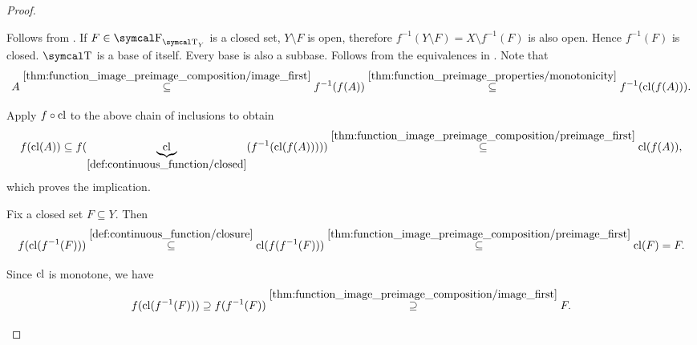 \begin{proof}
  \begin{description}
     Follows from .
     If \( F \in \CF_{\CT_Y} \) is a closed set, \( Y \setminus F \) is open, therefore \( f^{-1}(Y \setminus F) = X \setminus f^{-1}(F) \) is also open. Hence \( f^{-1}(F) \) is closed.
     \( \CT \) is a base of itself.
     Every base is also a subbase.
     Follows from the equivalences in .
     Note that
    \begin{equation*}
      A
      \overset {\ref{thm:function_image_preimage_composition/image_first}} \subseteq
      f^{-1}(f(A))
      \overset {\ref{thm:function_preimage_properties/monotonicity}} \subseteq
      f^{-1}(\operatorname{cl}(f(A))).
    \end{equation*}

    Apply \( f \circ \operatorname{cl} \) to the above chain of inclusions to obtain
    \begin{equation*}
      f(\operatorname{cl}(A))
      \subseteq
      f(\underbrace{\operatorname{cl}}_{\ref{def:continuous_function/closed}}(f^{-1}(\operatorname{cl}(f(A)))))
      \overset {\ref{thm:function_image_preimage_composition/preimage_first}} \subseteq
      \operatorname{cl}(f(A)),
    \end{equation*}
    which proves the implication.

     Fix a closed set \( F \subseteq Y \). Then
    \begin{equation}\label{def:continuous_function/closure_implies_closed_right}
      f(\operatorname{cl}(f^{-1}(F)))
      \overset {\ref{def:continuous_function/closure}} \subseteq
      \operatorname{cl}(f(f^{-1}(F)))
      \overset {\ref{thm:function_image_preimage_composition/preimage_first}} \subseteq
      \operatorname{cl}(F)
      =
      F.
    \end{equation}

    Since \( \operatorname{cl} \) is monotone, we have
    \begin{equation}\label{def:continuous_function/closure_implies_closed_left}
      f(\operatorname{cl}(f^{-1}(F)))
      \supseteq
      f(f^{-1}(F))
      \overset {\ref{thm:function_image_preimage_composition/image_first}} \supseteq
      F.
    \end{equation}


\end{description}
\end{proof}
